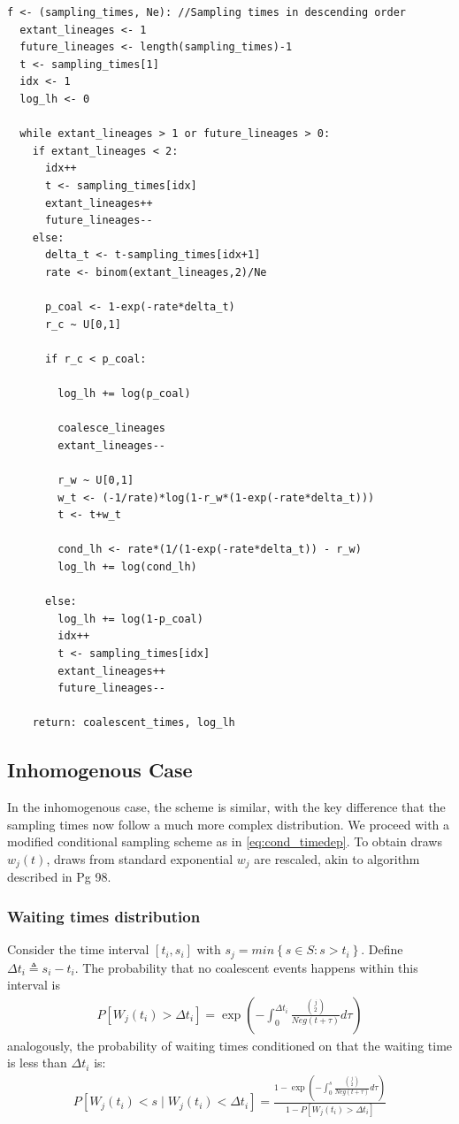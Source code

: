 \documentclass{article}
\theoremstyle{definition}
\begin{document}
\begin{lstlisting}
f <- (sampling_times, Ne): //Sampling times in descending order
  extant_lineages <- 1
  future_lineages <- length(sampling_times)-1
  t <- sampling_times[1]
  idx <- 1
  log_lh <- 0

  while extant_lineages > 1 or future_lineages > 0:
    if extant_lineages < 2:
      idx++
      t <- sampling_times[idx]
      extant_lineages++
      future_lineages--
    else:
      delta_t <- t-sampling_times[idx+1]
      rate <- binom(extant_lineages,2)/Ne

      p_coal <- 1-exp(-rate*delta_t)
      r_c ~ U[0,1] 

      if r_c < p_coal:

        log_lh += log(p_coal)

        coalesce_lineages
        extant_lineages--

        r_w ~ U[0,1]
        w_t <- (-1/rate)*log(1-r_w*(1-exp(-rate*delta_t)))
        t <- t+w_t

        cond_lh <- rate*(1/(1-exp(-rate*delta_t)) - r_w)
        log_lh += log(cond_lh)

      else:
        log_lh += log(1-p_coal)
        idx++
        t <- sampling_times[idx]
        extant_lineages++
        future_lineages--

    return: coalescent_times, log_lh
\end{lstlisting}

\subsection{Inhomogenous Case}
In the inhomogenous case, the scheme is similar, with the key difference that the sampling times now follow a much more complex distribution. We proceed with a modified conditional sampling scheme as in \ref{eq:cond_timedep}. To obtain draws $w_j(t)$, draws from standard exponential $w_j$ are rescaled, akin to algorithm described in \cite{hein_gene_2004} Pg 98.
\subsubsection{Waiting times distribution}
Consider the time interval $[t_i, s_i]$ with $s_j = min\left\{s\in S : s>t_i\right\}$. Define $\Delta t_i \triangleq s_i-t_i$.
The probability that no coalescent events happens within this interval is 
\begin{gather*}
  P[W_j(t_i) > \Delta t_i] = \exp(-\int_0^{\Delta t_i}\frac{\binom{j}{2}}{Neg(t+\tau)}d\tau)
\end{gather*}
analogously, the probability of waiting times conditioned on that the waiting time is less than $\Delta t_i$ is:
\begin{gather}
  P[W_j(t_i) < s \mid W_j(t_i) < \Delta t_i] =\frac{1-\exp(-\int_0^{s}\frac{\binom{j}{2}}{Neg(t+\tau)}d\tau)}{1-P[W_j(t_i) > \Delta t_i]}
\end{gather}
\end{document}
